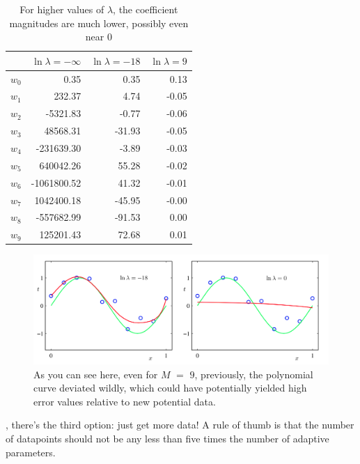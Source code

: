 \documentclass{tufte-handout}
\begin{document}
\begin{table}[h]
  \begin{center}
    \begin{tabular}{lrrr}
      \toprule
       & $\ln\lambda = -\infty$ & $\ln\lambda = -18$ & $\ln\lambda = 9$ \\
      \midrule
      $w_0$ &        0.35 &   0.35 &  0.13 \\
      $w_1$ &      232.37 &   4.74 & -0.05 \\
      $w_2$ &    -5321.83 &  -0.77 & -0.06 \\
      $w_3$ &    48568.31 & -31.93 & -0.05 \\
      $w_4$ &  -231639.30 &  -3.89 & -0.03 \\
      $w_5$ &   640042.26 &  55.28 & -0.02 \\
      $w_6$ & -1061800.52 &  41.32 & -0.01 \\
      $w_7$ &  1042400.18 & -45.95 & -0.00 \\
      $w_8$ &  -557682.99 & -91.53 &  0.00 \\
      $w_9$ &   125201.43 &  72.68 &  0.01 \\
      \bottomrule
    \end{tabular}
  \end{center}
  \caption{For higher values of $\lambda$, the coefficient magnitudes are much
    lower, possibly even near $0$}
  \label{tab:font-sizes}
\end{table}

\begin{figure}[h] \label{}
  \includegraphics[width=\linewidth]{lambda.png}
  \caption{As you can see here, even for $M$ $=$ $9$,
  previously, the polynomial curve deviated wildly, which could have
  potentially yielded high error values relative to new potential data.}
\end{figure}

\break

, there's the third option: just get more data! A rule of
thumb is that the number of datapoints should not be any less than five times
the number of adaptive parameters.
\end{document}
